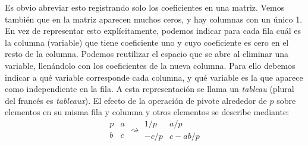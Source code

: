   Es obvio abreviar esto registrando solo los coeficientes en una matriz.
  Vemos también que en la matriz aparecen muchos ceros,
  y hay columnas con un único \num{1}.
  En vez de representar esto explícitamente,
  podemos indicar para cada fila cuál es la columna (variable)
  que tiene coeficiente uno
  y cuyo coeficiente es cero en el resto de la columna.
  Podemos reutilizar el espacio que se abre al eliminar una variable,
  llenándolo con los coeficientes de la nueva columna.
  Para ello debemos indicar a qué variable corresponde cada columna,
  y qué variable es la que aparece como independiente en la fila.
  A esta representación se llama un \emph{\foreignlanguage{french}{tableau}}
  (plural del francés es \emph{\foreignlanguage{french}{tableaux}}).
  El efecto de la operación
  de pivote alrededor de \(p\) sobre elementos en su misma fila y columna
  y otros elementos se describe mediante:
  \begin{equation}
    \label{eq:pivote}
    \boxed{
      \begin{array}{cc}
        p & a \\
        b & c
      \end{array}
    }
    \rightsquigarrow
    \boxed{
      \begin{array}{cc}
          1 / p & a / p \\
        - c / p & c - a b / p
      \end{array}
    }
  \end{equation}

